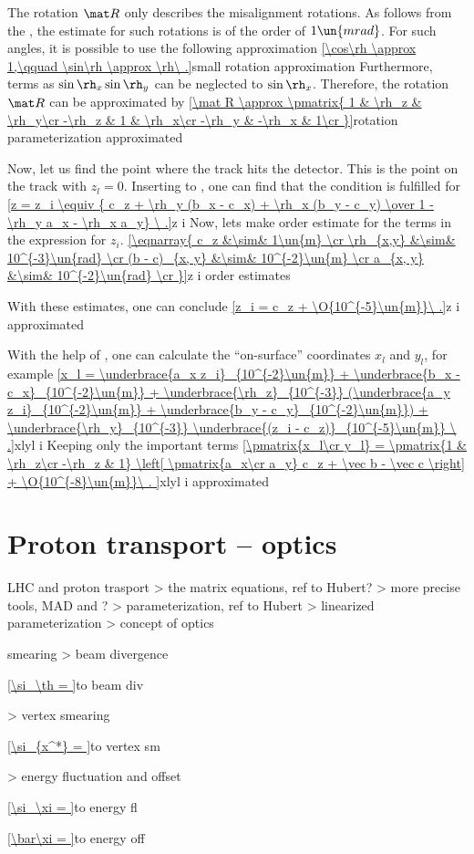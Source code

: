 \TODO{} The rotation $\mat R$ only describes the misalignment rotations. As follows from the , the estimate for such rotations is of the order of $1\un{mrad}$. For such angles, it is possible to use the following approximation
\eqref{\cos\rh \approx 1,\qquad \sin\rh \approx \rh\ .}{small rotation approximation}
Furthermore, terms as $\sin\rh_x \sin\rh_y$ can be neglected to $\sin\rh_x$. Therefore, the rotation $\mat R$ can be approximated by
\eqref{\mat R \approx \pmatrix{
1 & \rh_z & \rh_y\cr
-\rh_z & 1 & \rh_x\cr
-\rh_y & -\rh_x & 1\cr
}}{rotation parameterization approximated}


Now, let us find the point where the track  hits the detector. This is the point on the track with $z_l = 0$. Inserting  to , one can find that the condition is fulfilled for 
\eqref{z = z_i \equiv { c_z + \rh_y (b_x - c_x) + \rh_x (b_y - c_y) \over 1 - \rh_y a_x - \rh_x a_y} \ .}{z i}
Now, lets make order estimate for the terms in the expression for $z_i$.\hfil\break
\eqref{\eqnarray{
c_z &\sim& 1\un{m} \cr
\rh_{x,y} &\sim& 10^{-3}\un{rad} \cr
(b - c)_{x, y} &\sim& 10^{-2}\un{m} \cr
a_{x, y} &\sim& 10^{-2}\un{rad} \cr
}}{z i order estimates}

With these estimates, one can conclude
\eqref{z_i = c_z + \O{10^{-5}\un{m}}\ .}{z i approximated}

With the help of , one can calculate the ``on-surface'' coordinates $x_l$ and $y_l$, for example
\eqref{x_l = 
\underbrace{a_x z_i}_{10^{-2}\un{m}}
+ \underbrace{b_x - c_x}_{10^{-2}\un{m}} 
+ \underbrace{\rh_z}_{10^{-3}} (\underbrace{a_y z_i}_{10^{-2}\un{m}} + \underbrace{b_y - c_y}_{10^{-2}\un{m}})
+ \underbrace{\rh_y}_{10^{-3}} \underbrace{(z_i - c_z)}_{10^{-5}\un{m}}
\ .}{xlyl i}
Keeping only the important terms
\eqref{\pmatrix{x_l\cr y_l} = \pmatrix{1 & \rh_z\cr -\rh_z & 1}
\left[
\pmatrix{a_x\cr a_y} c_z + \vec b - \vec c
\right] + \O{10^{-8}\un{m}}\ .
}{xlyl i approximated}


\section[pr transport]{Proton transport -- optics}

\> LHC and proton trasport
\>> the matrix equations, ref to Hubert?
\>> more precise tools, MAD and ?
\>> parameterization, ref to Hubert
\>> linearized parameterization
\>> concept of optics

\> smearing
\>> beam divergence

\eqref{\si_\th = }{to beam div}

\>> vertex smearing

\eqref{\si_{x^*} = }{to vertex sm}

\>> energy fluctuation and offset

\eqref{\si_\xi = }{to energy fl}

\eqref{\bar\xi = }{to energy off}
